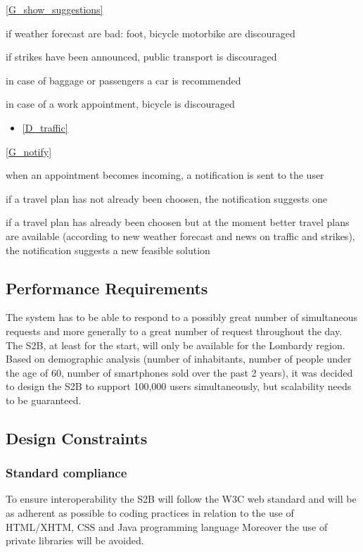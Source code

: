 	\noindent\ref{G_show_suggestions}
	\begin{enumerate}[resume, label={[R\arabic*]}]
	\item \label{R_bad_weather} if weather forecast are bad: foot, bicycle motorbike are discouraged
	\item \label{R_strikes} if strikes have been announced, public transport is discouraged
	\item \label{R_baggage_passengers} in case of baggage or passengers a car is recommended
	\item \label{R_work} in case of a work appointment, bicycle is discouraged
	\end{enumerate}
	\begin{itemize}
		\item[] \ref{D_traffic}
	\end{itemize}
	
	
	\noindent\ref{G_notify}
	\begin{enumerate}[resume, label={[R\arabic*]}]
	\item \label{R_incoming_notified} when an appointment becomes incoming, a notification is sent to the user
	\item \label{R_notChoosen_suggests} if a travel plan has not already been choosen, the notification suggests one
	\item \label{R_choosen_update} if a travel plan has already been choosen but at the moment better travel plans are available (according to new weather forecast and news on traffic and strikes), the notification suggests a new feasible solution
	\end{enumerate}
	
\subsection{Performance Requirements}
The system has to be able to respond to a possibly great number of simultaneous requests and
more generally to a great number of request throughout the day.
The S2B, at least for the start, will only be available for the Lombardy region. Based on demographic analysis (number of inhabitants, number of people under the age of 60, number of smartphones sold over the past 2 years), it was decided to design the S2B to support 100,000 users simultaneously, but scalability needs to be guaranteed.
\subsection{Design Constraints}
	\subsubsection{Standard compliance}
	To ensure interoperability the S2B will follow the W3C web standard and will be as adherent as possible to  coding practices in relation to the use of HTML/XHTM, CSS and Java programming language
	Moreover the use of private libraries will be avoided.
